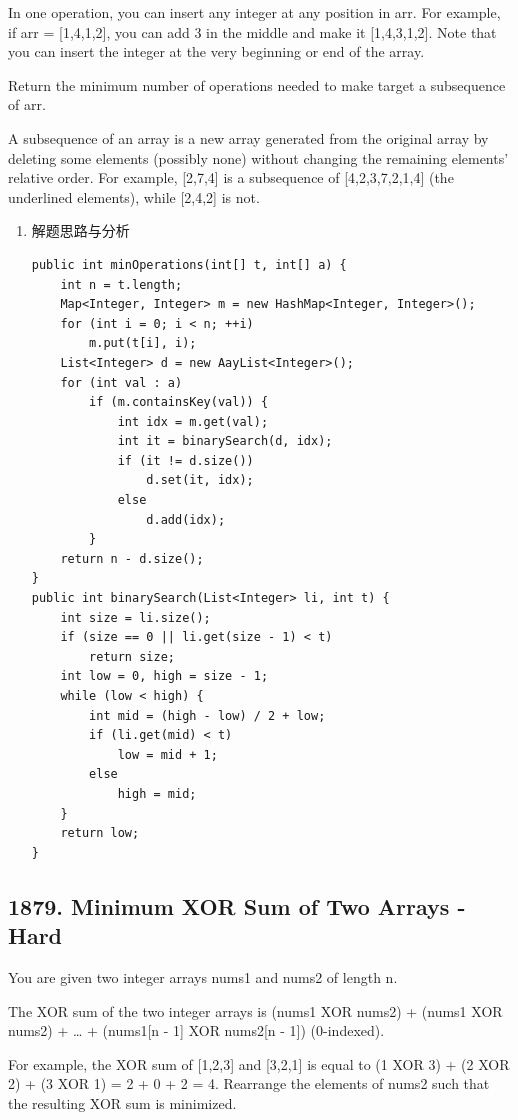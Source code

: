\documentclass[9pt, b5paaper]{book}
\begin{document}
In one operation, you can insert any integer at any position in arr. For example, if arr = [1,4,1,2], you can add 3 in the middle and make it [1,4,3,1,2]. Note that you can insert the integer at the very beginning or end of the array.

Return the minimum number of operations needed to make target a subsequence of arr.

A subsequence of an array is a new array generated from the original array by deleting some elements (possibly none) without changing the remaining elements' relative order. For example, [2,7,4] is a subsequence of [4,2,3,7,2,1,4] (the underlined elements), while [2,4,2] is not.
\begin{enumerate}
\item 解题思路与分析
\label{sec-1-4-5-1}
\begin{verbatim}
public int minOperations(int[] t, int[] a) {
    int n = t.length;
    Map<Integer, Integer> m = new HashMap<Integer, Integer>();
    for (int i = 0; i < n; ++i) 
        m.put(t[i], i);
    List<Integer> d = new AayList<Integer>();
    for (int val : a) 
        if (m.containsKey(val)) {
            int idx = m.get(val);
            int it = binarySearch(d, idx);
            if (it != d.size()) 
                d.set(it, idx);
            else 
                d.add(idx);
        }
    return n - d.size();
}
public int binarySearch(List<Integer> li, int t) {
    int size = li.size();
    if (size == 0 || li.get(size - 1) < t) 
        return size;
    int low = 0, high = size - 1;
    while (low < high) {
        int mid = (high - low) / 2 + low;
        if (li.get(mid) < t) 
            low = mid + 1;
        else 
            high = mid;
    }
    return low;
}
\end{verbatim}
\end{enumerate}
\subsection{1879. Minimum XOR Sum of Two Arrays - Hard}
\label{sec-1-4-6}
You are given two integer arrays nums1 and nums2 of length n.

The XOR sum of the two integer arrays is (nums1\footnotemark[1]{} XOR nums2\footnotemark[1]{}) + (nums1\footnotemark[2]{} XOR nums2\footnotemark[2]{}) + \ldots{} + (nums1[n - 1] XOR nums2[n - 1]) (0-indexed).

For example, the XOR sum of [1,2,3] and [3,2,1] is equal to (1 XOR 3) + (2 XOR 2) + (3 XOR 1) = 2 + 0 + 2 = 4.
Rearrange the elements of nums2 such that the resulting XOR sum is minimized.
\end{document}
